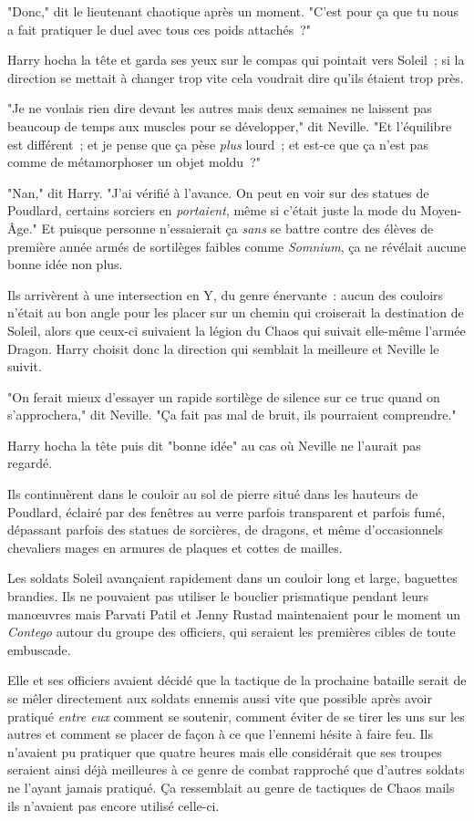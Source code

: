"Donc," dit le lieutenant chaotique après un moment. "C'est pour ça que tu nous a fait pratiquer le duel avec tous ces poids attachés~?"

Harry hocha la tête et garda ses yeux sur le compas qui pointait vers Soleil~; si la direction se mettait à changer trop vite cela voudrait dire qu'ils étaient trop près.

"Je ne voulais rien dire devant les autres mais deux semaines ne laissent pas beaucoup de temps aux muscles pour se développer," dit Neville. "Et l'équilibre est différent~; et je pense que ça pèse \emph{plus} lourd~; et est-ce que ça n'est pas comme de métamorphoser un objet moldu~?"

"Nan," dit Harry. "J'ai vérifié à l'avance. On peut en voir sur des statues de Poudlard, certains sorciers en \emph{portaient}, même si c'était juste la mode du Moyen-Âge." Et puisque personne n'essaierait ça \emph{sans} se battre contre des élèves de première année armés de sortilèges faibles comme \emph{Somnium}, ça ne révélait aucune bonne idée non plus.

Ils arrivèrent à une intersection en Y, du genre énervante~: aucun des couloirs n'était au bon angle pour les placer sur un chemin qui croiserait la destination de Soleil, alors que ceux-ci suivaient la légion du Chaos qui suivait elle-même l'armée Dragon. Harry choisit donc la direction qui semblait la meilleure et Neville le suivit.

"On ferait mieux d'essayer un rapide sortilège de silence sur ce truc quand on s'approchera," dit Neville. "Ça fait pas mal de bruit, ils pourraient comprendre."

Harry hocha la tête puis dit "bonne idée" au cas où Neville ne l'aurait pas regardé.

Ils continuèrent dans le couloir au sol de pierre situé dans les hauteurs de Poudlard, éclairé par des fenêtres au verre parfois transparent et parfois fumé, dépassant parfois des statues de sorcières, de dragons, et même d'occasionnels chevaliers mages en armures de plaques et cottes de mailles.

\later

Les soldats Soleil avançaient rapidement dans un couloir long et large, baguettes brandies. Ils ne pouvaient pas utiliser le bouclier prismatique pendant leurs manœuvres mais Parvati Patil et Jenny Rustad maintenaient pour le moment un \emph{Contego} autour du groupe des officiers, qui seraient les premières cibles de toute embuscade.

Elle et ses officiers avaient décidé que la tactique de la prochaine bataille serait de se mêler directement aux soldats ennemis aussi vite que possible après avoir pratiqué \emph{entre eux} comment se soutenir, comment éviter de se tirer les uns sur les autres et comment se placer de façon à ce que l'ennemi hésite à faire feu. Ils n'avaient pu pratiquer que quatre heures mais elle considérait que ses troupes seraient ainsi déjà meilleures à ce genre de combat rapproché que d'autres soldats ne l'ayant jamais pratiqué. Ça ressemblait au genre de tactiques de Chaos mails ils n'avaient pas encore utilisé celle-ci.

